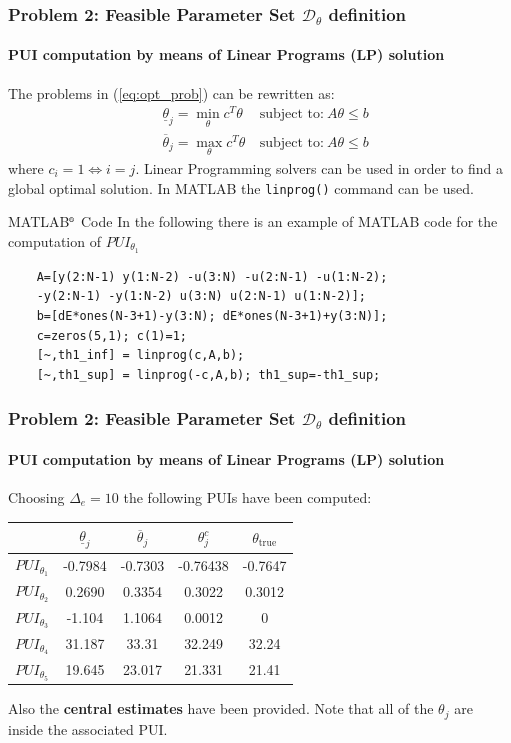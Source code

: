 \documentclass{beamer}
\begin{document}
\begin{frame}[fragile]
    \frametitle{Problem 2: Feasible Parameter Set $\mathcal{D}_\theta$ definition}
    \framesubtitle{PUI computation by means of Linear Programs (LP) solution}
    The problems in (\ref{eq:opt_prob}) can be rewritten as:
    \begin{align}
            &\underline{\theta}_j = \min_{\theta}{c^T{\theta}} \ &\text{subject to:} \ A\theta\le{b} \\
            &\overline{\theta}_j = \max_{\theta}{c^T{\theta}} \ &\text{subject to:} \ A\theta\le{b}
    \end{align}
    where $c_i=1 \iff i=j$. Linear Programming solvers can be used in order to find a \alert{global optimal solution.} In MATLAB the \texttt{linprog()} command can be used.
    \begin{exampleblock}{MATLAB$^\text{\tiny\textregistered}$ Code}\justifying
        \small
         In the following there is an example of MATLAB code for the computation of $PUI_{\theta_1}$
        {\tiny{
            \begin{verbatim}
    A=[y(2:N-1) y(1:N-2) -u(3:N) -u(2:N-1) -u(1:N-2); 
    -y(2:N-1) -y(1:N-2) u(3:N) u(2:N-1) u(1:N-2)];
    b=[dE*ones(N-3+1)-y(3:N); dE*ones(N-3+1)+y(3:N)];
    c=zeros(5,1); c(1)=1; 
    [~,th1_inf] = linprog(c,A,b); 
    [~,th1_sup] = linprog(-c,A,b); th1_sup=-th1_sup;
                        \end{verbatim}
        }}
    \end{exampleblock}
\end{frame}

\begin{frame}
    \frametitle{Problem 2: Feasible Parameter Set $\mathcal{D}_\theta$ definition}
    \framesubtitle{PUI computation by means of Linear Programs (LP) solution}

    Choosing $\Delta_e=10$ the following PUIs have been computed:
    \begin{table}
        \centering
        \begin{tabular}{c c c c c}
             &$\underline{\theta}_j$&$\overline{\theta}_j$&$\theta_j^c$&$  \theta_{\text{true}}$\\
            \hline\hline
            $PUI_{\theta_1}$\vline\vline&-0.7984&-0.7303&-0.76438&-0.7647\\
            $PUI_{\theta_2}$\vline\vline&0.2690&0.3354&0.3022&0.3012\\
            $PUI_{\theta_3}$\vline\vline&-1.104&1.1064&0.0012&0\\
            $PUI_{\theta_4}$\vline\vline&31.187&33.31&32.249&32.24\\
            $PUI_{\theta_5}$\vline\vline&19.645&23.017&21.331&21.41\\
        \end{tabular}
    \end{table}
    Also the  \textbf{central estimates} have been provided. Note that all of the $\theta_j$ are inside the associated PUI.
\end{frame}     
\end{document}
